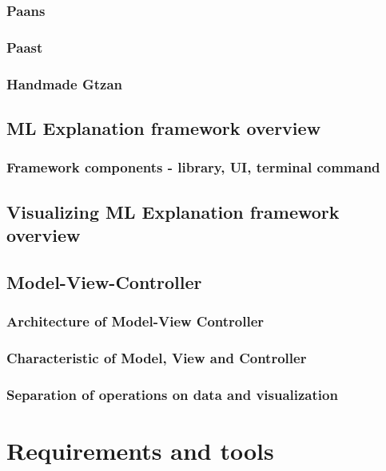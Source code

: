 \documentclass[
    bindingoffset=5mm,  %
    footnoteindent=3mm, %
    hyphenation=true    %
]{src/wut-thesis}
\begin{document}
\subsubsection{Paans}
\subsubsection{Paast}
\subsubsection{Handmade Gtzan}

\subsection{ML Explanation framework overview}
\subsubsection{Framework components - library, UI, terminal command}

\subsection{Visualizing ML Explanation framework overview} 

\subsection{Model-View-Controller} \label{ch1:ModelViewController}
\subsubsection{Architecture of Model-View Controller}
\subsubsection{Characteristic of Model, View and Controller}
\subsubsection{Separation of operations on data and visualization}

%
%
\clearpage %
\section{Requirements and tools} \label{ch:reqrTools}
\end{document}
